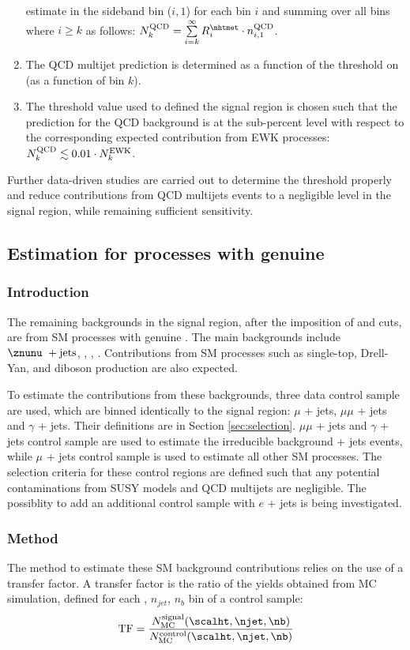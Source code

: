 \begin{enumerate}
  estimate in the \mhtmet sideband bin ($i,1$) for each bin $i$ and
  summing over all bins where $i \geq k$ as follows: $N^{\rm QCD}_{k}
  = \sum\limits^{\infty}_{i=k} R_{i}^{\mhtmet} \cdot n^{\rm
    QCD}_{i,1}$.
\item The QCD multijet prediction is determined as a function of the
  threshold on \alphat (\ie as a function of bin $k$).
\item The \alphat threshold value used to defined the signal region is
  chosen such that the prediction for the QCD background is at the
  sub-percent level with respect to the corresponding expected
  contribution from EWK processes: $N^{\rm QCD}_{k} \lesssim 0.01
  \cdot N^{\rm EWK}_{k}$.
\end{enumerate}

Further data-driven studies are carried out to determine the \alphat threshold properly and reduce contributions from QCD multijets events to a negligible level in the signal region, while remaining sufficient sensitivity.

\subsection{Estimation for processes with genuine \met}
\subsubsection{Introduction}
The remaining backgrounds in the signal region, after the imposition of \alphat and \mhtmet cuts, are from SM processes with genuine \met. The main backgrounds include $\znunu\ + \textrm{jets}$, \wj, \zj, \ttbar. Contributions from SM processes such as single-top, Drell-Yan, and diboson production are also expected.

To estimate the contributions from these backgrounds, three data control sample are used, which are binned identically to the signal region: $\mu$ + jets, $\mu\mu$ + jets and $\gamma$ + jets. Their definitions are in Section \ref{sec:selection}. $\mu\mu$ + jets and $\gamma$ + jets control sample are used to estimate the irreducible background \znunu + jets events, while $\mu$ + jets control sample is used to estimate all other SM processes. The selection criteria for these control regions are defined such that any potential contaminations from SUSY models and QCD multijets are negligible. The possiblity to add an additional control sample with $e$ + jets is being investigated.


\subsubsection{Method}
\label{sec:ewk-method}
The method to estimate these SM background contributions relies on the use of a transfer factor. A transfer factor is the ratio of the yields obtained from MC simulation, defined for each \scalht, $n_{jet}$, $n_b$ bin of a control sample:
\begin{equation}
  \label{equ:tf-ratio}
  {\rm TF} = \frac{N_{\rm MC}^{\rm signal}(\scalht,\njet,\nb)}{N_{\rm
      MC}^{\rm control}(\scalht,\njet,\nb)} 
\end{equation}

